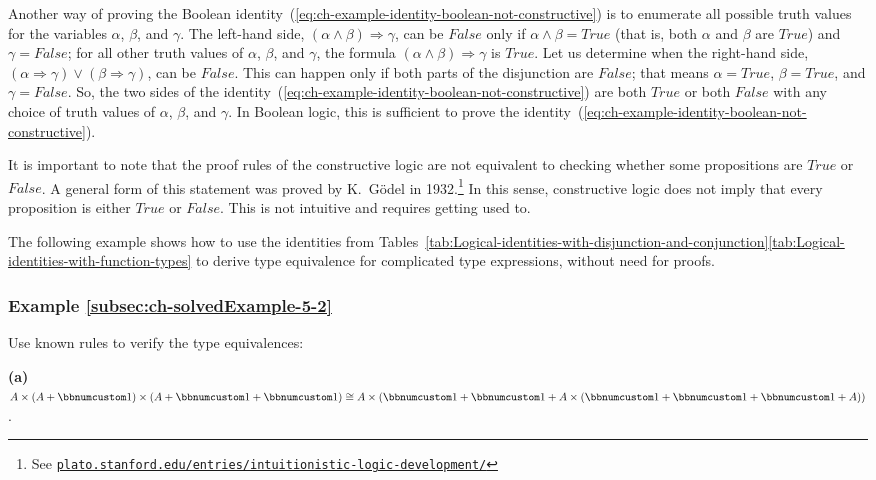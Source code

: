 Another way of proving the Boolean identity~(\ref{eq:ch-example-identity-boolean-not-constructive})
is to enumerate all possible truth values for the variables $\alpha$,
$\beta$, and $\gamma$. The left-hand side, $\left(\alpha\wedge\beta\right)\Rightarrow\gamma$,
can be $False$ only if $\alpha\wedge\beta=True$ (that is, both $\alpha$
and $\beta$ are $True$) and $\gamma=False$; for all other truth
values of $\alpha$, $\beta$, and $\gamma$, the formula $\left(\alpha\wedge\beta\right)\Rightarrow\gamma$
is $True$. Let us determine when the right-hand side, $(\alpha\Rightarrow\gamma)\vee(\beta\Rightarrow\gamma)$,
can be $False$. This can happen only if both parts of the disjunction
are $False$; that means $\alpha=True$, $\beta=True$, and $\gamma=False$.
So, the two sides of the identity~(\ref{eq:ch-example-identity-boolean-not-constructive})
are both $True$ or both $False$ with any choice of truth values
of $\alpha$, $\beta$, and $\gamma$. In Boolean logic, this is sufficient
to prove the identity~(\ref{eq:ch-example-identity-boolean-not-constructive}).

It is important to note that the proof rules of the constructive logic
are not equivalent to checking whether some propositions are $True$
or $False$. A general form of this statement was proved by K.~G\"odel
in 1932.\footnote{See \texttt{\href{https://plato.stanford.edu/entries/intuitionistic-logic-development/\#SomeEarlResu}{plato.stanford.edu/entries/intuitionistic-logic-development/}}}
In this sense, constructive logic does not imply that every proposition
is either $True$ or $False$. This is not intuitive and requires
getting used to.

The following example shows how to use the identities from Tables~\ref{tab:Logical-identities-with-disjunction-and-conjunction}\textendash \ref{tab:Logical-identities-with-function-types}
to derive type equivalence for complicated type expressions, without
need for proofs.

\subsubsection{Example \label{subsec:ch-solvedExample-5-2}\ref{subsec:ch-solvedExample-5-2}}

Use known rules to verify the type equivalences:

\textbf{(a)} $A\times\left(A+\bbnum 1\right)\times\left(A+\bbnum 1+\bbnum 1\right)\cong A\times\left(\bbnum 1+\bbnum 1+A\times\left(\bbnum 1+\bbnum 1+\bbnum 1+A\right)\right)$.

